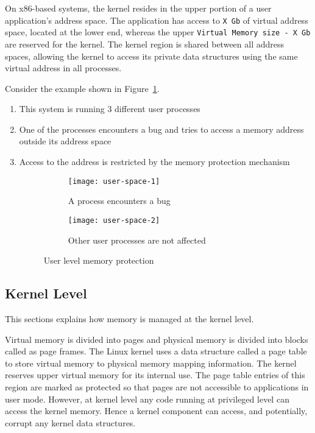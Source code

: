 On x86-based systems, the kernel resides in the upper portion of a user 
application's address space.  The application has access to \texttt{X Gb} 
of virtual address space, located at the lower end, whereas
the upper \texttt{Virtual Memory size - X Gb} are reserved 
for the kernel.  The kernel region is shared between all address
spaces, allowing the kernel to access its private data structures
using the same virtual address in all processes.

Consider the example shown in Figure~\ref{fig:User space}.
\begin{enumerate}
\item This system is running 3 different user processes
\item One of the processes encounters a bug and tries to access a memory address outside its address space
\item Access to the address is restricted by the memory protection mechanism
\begin{figure}[!ht]
    \centering
    \begin{subfigure}[b]{0.49\textwidth}
	\texttt{[image: user-space-1]}
	\caption{A process encounters a bug}
    \end{subfigure}
	\hfill
    \begin{subfigure}[b]{0.49\textwidth}
	\texttt{[image: user-space-2]}
	\caption{Other user processes are not affected}
    \end{subfigure}
    \caption{User level memory protection}\label{fig:User space}
\end{figure}
\end{enumerate}

\subsection{Kernel Level}
\label{subsec:kernel level}
This sections explains how memory is managed at the kernel level. 

Virtual memory is divided into pages and physical
memory is divided into blocks called as page frames. The Linux kernel uses
a data structure called a page table to store virtual memory to physical
memory mapping information. 
The kernel reserves upper virtual memory for its internal use. 
The page table entries of this region are marked
as protected so that pages are not accessible to applications in user mode.
However, at kernel level any code running at privileged level
can access the kernel memory.  Hence a kernel component can access,
and potentially, corrupt any kernel data structures.

